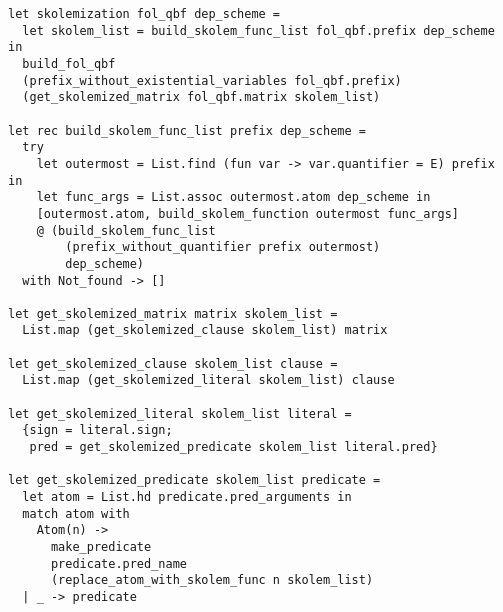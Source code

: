 \begin{lstlisting}[language=caml, label=skolemizationimpl]
let skolemization fol_qbf dep_scheme =
  let skolem_list = build_skolem_func_list fol_qbf.prefix dep_scheme in
  build_fol_qbf
  (prefix_without_existential_variables fol_qbf.prefix)
  (get_skolemized_matrix fol_qbf.matrix skolem_list)

let rec build_skolem_func_list prefix dep_scheme =
  try
    let outermost = List.find (fun var -> var.quantifier = E) prefix in
    let func_args = List.assoc outermost.atom dep_scheme in
    [outermost.atom, build_skolem_function outermost func_args]
    @ (build_skolem_func_list 
        (prefix_without_quantifier prefix outermost) 
        dep_scheme)
  with Not_found -> []

let get_skolemized_matrix matrix skolem_list =
  List.map (get_skolemized_clause skolem_list) matrix

let get_skolemized_clause skolem_list clause =
  List.map (get_skolemized_literal skolem_list) clause

let get_skolemized_literal skolem_list literal =
  {sign = literal.sign; 
   pred = get_skolemized_predicate skolem_list literal.pred}

let get_skolemized_predicate skolem_list predicate =
  let atom = List.hd predicate.pred_arguments in
  match atom with
    Atom(n) ->
      make_predicate
      predicate.pred_name
      (replace_atom_with_skolem_func n skolem_list)
  | _ -> predicate
\end{lstlisting}
